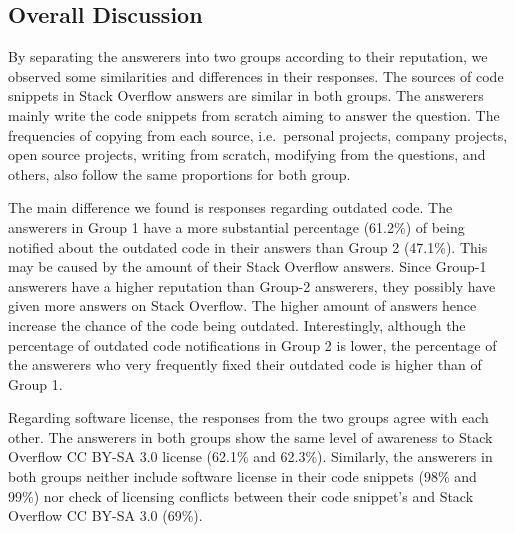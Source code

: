 \documentclass{svjour3}                     %
\newcommand\FIXME[1]{{\color{red}\textbf{FIXME: #1}}}
\begin{document}
\vspace{0.5cm} \noindent{} \vspace{0.5cm}


\subsection{Overall Discussion}

By separating the answerers into two groups according to their reputation, we
observed some similarities and differences in their responses. The sources of
code snippets in Stack Overflow answers are similar in both groups. The
answerers mainly write the code snippets from scratch aiming to answer the
question. The frequencies of copying from each source, i.e.~personal projects,
company projects, open source projects, writing from scratch, modifying from the
questions, and others, also follow the same proportions for both group.

The main difference we found is responses regarding outdated code. The answerers
in Group 1 have a more substantial percentage (61.2\%) of being notified about
the outdated code in their answers than Group 2 (47.1\%). This may be caused by
the amount of their Stack Overflow answers. Since Group-1 answerers have a
higher reputation than Group-2 answerers, they possibly have given more answers
on Stack Overflow. The higher amount of answers hence increase the chance of the
code being outdated. Interestingly, although the percentage of outdated code
notifications in Group 2 is lower, the percentage of the answerers who very
frequently fixed their outdated code is higher than of Group 1.

Regarding software license, the responses from the two groups agree with each
other. The answerers in both groups show the same level of awareness to Stack
Overflow CC BY-SA 3.0 license (62.1\% and 62.3\%). Similarly, the answerers in
both groups neither include software license in their code snippets (98\% and
99\%) nor check of licensing conflicts between their code snippet's and Stack
Overflow CC BY-SA 3.0 (69\%).
\end{document}
